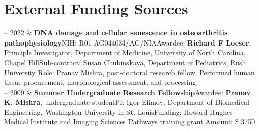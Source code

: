 \documentclass[10pt, letterpaper]{article}
\newcommand{\WASHU}{Washington University in St. Louis}
\newcommand{\RUSH}{Rush University}
\newcommand{\RUPEDS}{Department of Pediatrics}
\newcommand{\Duration}[2]{\fontsize{9pt}{0}\selectfont #1 -- #2}
\newcommand{\Appointment}[4]{\textbf{#1}\newline  #2\newline  #3\newline  #4}
\begin{document}
\section{External Funding Sources}
\begin{EntriesTable}
  \Duration{2021}{2022}  &
  \Appointment{DNA damage and cellular senescence in osteoarthritis pathophysiology}
  {NIH: R01 AG044034/AG/NIA}
  {Awardee: \textbf{Richard F Loeser}, Principle Investigator, Department of Medicine, University of North Carolina, Chapel Hill}
  {Sub-contract: Susan Chubinskaya, {\RUPEDS}, {\RUSH} \newline
  {Role: Pranav Mishra, post-doctoral research fellow. Performed human tissue procurement, morphological assessment, and processing}}
  \\
  \Duration{2009}{2009}  &
  \Appointment{Summer Undergraduate Research Fellowship}
  {Awardee: \textbf{Pranav K. Mishra}, undergraduate student}
  {PI: Igor Efimov, Department of Biomedical Engineering, {\WASHU}}
  {Funding: Howard Hughes Medical Institute and Imaging Sciences Pathways training grant \newline
  Amount: \$ 3750}

\end{EntriesTable}



\end{document}
